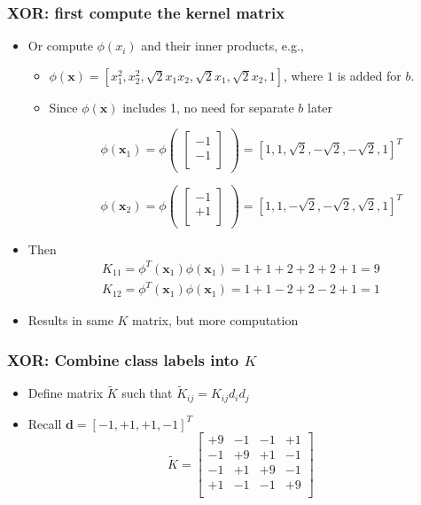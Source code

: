 \documentclass[12pt,notes,mathserif]{beamer}
\begin{document}
\begin{frame}[c]
\frametitle{XOR: first compute the kernel matrix}
\begin{itemize}
\item Or compute $\phi(x_i)$ and their inner products, e.g.,
\begin{itemize}
\item $\phi(\mathbf{x})=[x_1^2,x_2^2,\sqrt2x_1x_2,\sqrt2x_1,\sqrt2x_2,1]$, where $1$ is added for $b$. 
\item Since $\phi (\mathbf{x})$ includes 1, no need for separate $b$ later

\[
\phi(\mathbf{x}_1)=\phi\begin{pmatrix}\begin{bmatrix}
-1\\
-1\\
\end{bmatrix}
\end{pmatrix}=
[1,1,\sqrt2,-\sqrt2,-\sqrt2,1]^T
\]

\[
\phi(\mathbf{x}_2)=\phi\begin{pmatrix}\begin{bmatrix}
-1\\
+1\\
\end{bmatrix}
\end{pmatrix}=
[1,1,-\sqrt2,-\sqrt2,\sqrt2,1]^T
\]
\end{itemize}
\item Then
\begin{gather*}
K_{11}=\phi^T(\mathbf{x}_1)\phi(\mathbf{x}_1)=1+1+2+2+2+1=9\\
K_{12}=\phi^T(\mathbf{x}_1)\phi(\mathbf{x}_1)=1+1-2+2-2+1=1
\end{gather*}
\item Results in same $K$ matrix, but more computation
\end{itemize}
\end{frame}




\begin{frame}[c]
\frametitle{XOR: Combine class labels into $K$}
\begin{itemize}
\item Define matrix $\tilde{K}$ such that $\tilde{K}_{ij}=K_{ij}d_id_j$
\item Recall $\mathbf{d}=[-1,+1,+1,-1]^T$
\[
\tilde{K}=
\begin{bmatrix}
+9&-1&-1&+1\\
-1&+9&+1&-1\\
-1&+1&+9&-1\\
+1&-1&-1&+9\\
\end{bmatrix}
\]
\end{itemize}
\end{frame}
\end{document}
